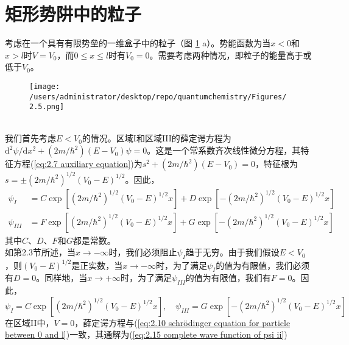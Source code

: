 \section{矩形势阱中的粒子}
	考虑在一个具有有限势垒的一维盒子中的粒子（图 \ref{fig:2.5} a）。势能函数为当$x<0$和$x>l$时$V=V_0$，而$0 \le x \le l$时有$V_0=0$。需要考虑两种情况，即粒子的能量高于或低于$V_0$。\\
	\begin{figure}[h!]
		\centering
		\texttt{[image: /users/administrator/desktop/repo/quantumchemistry/Figures/2.5.png]}  %
		\caption{}
		\label{fig:2.5}
	\end{figure}
	\\
	\indent 我们首先考虑$E < V_0$的情况。区域I和区域III的薛定谔方程为$\mathrm{d}^2\psi/\mathrm{d}x^2+\left(2m/\hbar^2\right)\left(E-V_0\right)\psi=0$。这是一个常系数齐次线性微分方程，其特征方程(\ref{eq:2.7 auxiliary equation})为$s^2+\left(2m/\hbar^2\right)\left(E-V_0\right)=0$，特征根为$s = \pm \left(2m/\hbar^2\right)^{1/2}\left(V_0-E\right)^{1/2}$。因此，
	\begin{equation*}
		\begin{aligned}
			\psi_I & = C \exp \left[\left(2m/\hbar^2\right)^{1/2}\left(V_0-E\right)^{1/2}x\right] + D \exp \left[-\left(2m/\hbar^2\right)^{1/2}\left(V_0-E\right)^{1/2}x\right] \\
			\psi_{III} & = F \exp \left[\left(2m/\hbar^2\right)^{1/2}\left(V_0-E\right)^{1/2}x\right] + G \exp \left[-\left(2m/\hbar^2\right)^{1/2}\left(V_0-E\right)^{1/2}x\right] 
		\end{aligned}
	\end{equation*}
	其中$C$、$D$、$F$和$G$都是常数。\\
	\indent 如第2.3节所述，当$x \to -\infty$时，我们必须阻止$\psi_I$趋于无穷。由于我们假设$E<V_0$，则$\left(V_0-E\right)^{1/2}$是正实数，当$x \to -\infty$时，为了满足$\psi_I$的值为有限值，我们必须有$D=0$。同样地，当$x \to +\infty$时，为了满足$\psi_{III}$的值为有限值，我们有$F=0$。因此，
	\begin{equation*}
		\psi_I  = C \exp \left[\left(2m/\hbar^2\right)^{1/2}\left(V_0-E\right)^{1/2}x\right] , \quad \psi_{III}  = G \exp \left[-\left(2m/\hbar^2\right)^{1/2}\left(V_0-E\right)^{1/2}x\right]
	\end{equation*}
	\indent 在区域II中，$V=0$，薛定谔方程与(\ref{eq:2.10 schrödinger equation for particle between 0 and l})一致，其通解为(\ref{eq:2.15 complete wave function of psi ii})
